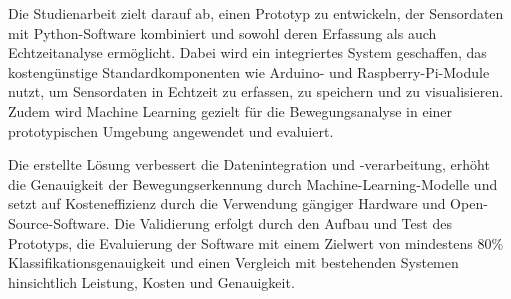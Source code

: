 \documentclass{scrartcl}
\begin{document}
Die Studienarbeit zielt darauf ab, einen Prototyp zu entwickeln, der Sensordaten mit Python-Software kombiniert und sowohl deren Erfassung als auch Echtzeitanalyse ermöglicht. Dabei wird ein integriertes System geschaffen, das kostengünstige Standardkomponenten wie Arduino- und Raspberry-Pi-Module nutzt, um Sensordaten in Echtzeit zu erfassen, zu speichern und zu visualisieren. Zudem wird Machine Learning gezielt für die Bewegungsanalyse in einer prototypischen Umgebung angewendet und evaluiert.

Die erstellte Lösung verbessert die Datenintegration und -verarbeitung, erhöht die Genauigkeit der Bewegungserkennung durch Machine-Learning-Modelle und setzt auf Kosteneffizienz durch die Verwendung gängiger Hardware und Open-Source-Software. Die Validierung erfolgt durch den Aufbau und Test des Prototyps, die Evaluierung der Software mit einem Zielwert von mindestens 80\% Klassifikationsgenauigkeit und einen Vergleich mit bestehenden Systemen hinsichtlich Leistung, Kosten und Genauigkeit.
\end{document}
